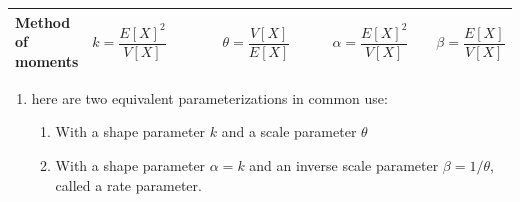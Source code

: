 \begin{customTableWrapper}{2}
\begin{longtable}{|m{3cm}|p{5.5cm}|p{5.5cm}|}
    \textbf{Method of moments} &
    $
        {\displaystyle k={\dfrac {E[X]^{2}}{V[X]}}\quad \quad }
        \quad\quad
        {\displaystyle \theta ={\dfrac {V[X]}{E[X]}}\quad \quad }
    $&
    $
        {\displaystyle \alpha ={\dfrac {E[X]^{2}}{V[X]}}}
        \quad\quad
        {\displaystyle \beta ={\dfrac {E[X]}{V[X]}}}
    $
    \\[1ex] \hline

\end{longtable}
\end{customTableWrapper}

\begin{enumerate}
    \item here are two equivalent parameterizations in common use:
    \begin{enumerate}
        \item With a shape parameter $k$ and a scale parameter $\theta$

        \item With a shape parameter ${\displaystyle \alpha =k}$ and an inverse scale parameter ${\displaystyle \beta =1/\theta }$, called a rate parameter.

    \end{enumerate}

\end{enumerate}




































